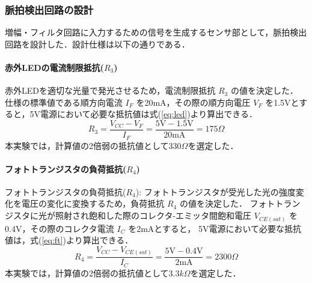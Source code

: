 \subsubsection{脈拍検出回路の設計}
増幅・フィルタ回路に入力するための信号を生成するセンサ部として，脈拍検出回路を設計した．設計仕様は以下の通りである．

\paragraph{赤外LEDの電流制限抵抗($R_3$)}
赤外LEDを適切な光量で発光させるため，電流制限抵抗 $R_3$ の値を決定した．
仕様の標準値である順方向電流 $I_F$ を20mA，その際の順方向電圧 $V_F$ を1.5Vとすると\cite{LBR-127HLD}，5V電源において必要な抵抗値は式(\ref{eq:led})より算出できる．
\begin{equation}
  R_3 = \frac{V_{CC} - V_F}{I_F} = \frac{5\text{V} - 1.5\text{V}}{20\text{mA}} = 175 \Omega \label{eq:led}
\end{equation}
本実験では，計算値の2倍弱の抵抗値として$330 \Omega$を選定した．

\paragraph{フォトトランジスタの負荷抵抗($R_4$)}
フォトトランジスタの負荷抵抗($R_4$): フォトトランジスタが受光した光の強度変化を電圧の変化に変換するため，負荷抵抗 $R_4$ の値を決定した．
フォトトランジスタに光が照射され飽和した際のコレクタ-エミッタ間飽和電圧 $V_{CE(sat)}$ を0.4V，その際のコレクタ電流 $I_C$ を2mAとすると\cite{LBR-127HLD}，
5V電源において必要な抵抗値は，式(\ref{eq:ft})より算出できる．
\begin{equation}
  R_4 = \frac{V_{CC} - V_{CE(sat)}}{I_C} = \frac{5\text{V} - 0.4\text{V}}{2\text{mA}} = 2300 \Omega \label{eq:ft}
\end{equation}
本実験では，計算値の2倍弱の抵抗値として$3.3k \Omega$を選定した．


